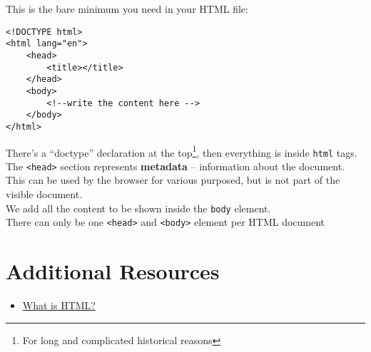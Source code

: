 This is the bare minimum you need in your HTML file:

\begin{verbatim}
<!DOCTYPE html>
<html lang="en">
    <head>
        <title></title>
    </head>
    <body>
        <!--write the content here -->
    </body>
</html>
\end{verbatim}

There's a ``doctype'' declaration at the top\footnote{For long and complicated historical reasons}, then everything is inside \texttt{html} tags.
\\

The \texttt{<head>} section represents \textbf{metadata} – information about the document. This can be used by the browser for various purposed, but is not part of the visible document.
\\

We add all the content to be shown inside the \texttt{body} element.
\\

There can only be one \texttt{<head>} and \texttt{<body>} element per HTML document


\section{Additional Resources}

\begin{itemize}[leftmargin=*]
    \item \href{https://www.linkedin.com/learning/html-essential-training-4/what-is-html}{What is HTML?}
\end{itemize}
